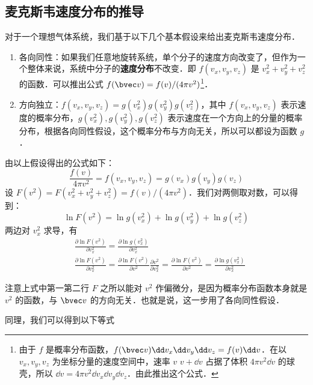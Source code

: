 \subsection{麦克斯韦速度分布的推导}
对于一个理想气体系统，我们基于以下几个基本假设来给出麦克斯韦速度分布．

\begin{enumerate}
\item 各向同性：如果我们任意地旋转系统，单个分子的速度方向改变了，但作为一个整体来说，系统中分子的\textbf{速度分布}不改变．即 $f(v_x,v_y,v_z)$ 是 $v_x^2+v_y^2+v_z^2$ 的函数．可以推出公式 $f(\bvec v)=f(v)/(4\pi v^2)$\footnote{由于 $f$ 是概率分布函数，$f(\bvec v)\dd v_x\dd v_y\dd v_z=f(v)\dd v$．在以 $v_x,v_y,v_z$ 为坐标分量的速度空间中，速率 $v\text{~}v+\dd v$ 占据了体积 $4\pi v^2\dd v$ 的球壳，所以 $\dd v=4\pi v^2 \dd v_x\dd v_y\dd v_z$．由此推出这个公式．}．

\item 方向独立：$f(v_x,v_y,v_z)=g(v_x^2)g(v_y^2)g(v_z^2)$，其中 $f(v_x,v_y,v_z)$ 表示速度的概率分布，$g(v_x^2),g(v_y^2),g(v_z^2)$ 表示速度在一个方向上的分量的概率分布，根据各向同性假设，这个概率分布与方向无关，所以可以都设为函数 $g$．
\end{enumerate}

由以上假设得出的公式如下：
\begin{equation}
\frac{f(v)}{4\pi v^2}=f(v_x,v_y,v_z)=g(v_x)g(v_y)g(v_z)
\end{equation}
设 $F(v^2)=F(v_x^2+v_y^2+v_z^2)=f(v)/(4\pi v^2)$．我们对两侧取对数，可以得到：
\begin{equation}
\ln F(v^2)=\ln g(v_x^2)+\ln g(v_y^2)+\ln g(v_z^2)
\end{equation}
两边对 $v_x^2$ 求导，有
\begin{equation}
\begin{aligned}
&\frac{\partial \ln F(v^2)}{\partial v_x^2}=\frac{\partial \ln g(v_x^2)}{\partial v_x^2}
\\
&\frac{\partial \ln F(v^2)}{\partial v_x^2}=\frac{\partial \ln F(v^2)}{\partial v^2} \frac{\partial v^2}{\partial v_x^2}=\frac{\partial \ln F(v^2)}{\partial v^2}=\frac{\partial \ln g(v_x^2)}{\partial v_x^2}
\end{aligned}
\end{equation}

注意上式中第一第二行 $F$ 之所以能对 $v^2$ 作偏微分，是因为概率分布函数本身就是 $v^2$ 的函数，与 $\bvec v$ 的方向无关．也就是说，这一步用了各向同性假设．

同理，我们可以得到以下等式


